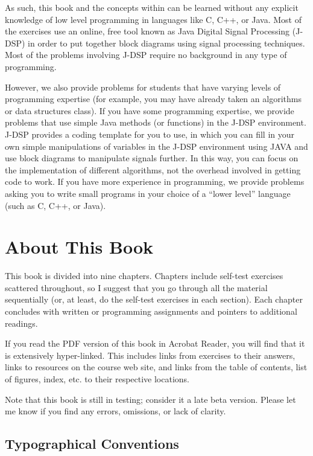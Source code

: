 As such, this book and the concepts within can be learned without any explicit 
knowledge of low level programming in languages like C, C++, or Java. Most of the 
exercises use an online, free tool known as Java Digital Signal Processing (J-DSP)
in order to put together block diagrams using signal processing techniques.
Most of the problems involving J-DSP require no background in any type of programming.  

However, we also provide problems for students that have varying 
levels of programming expertise (for example, you may have already taken an 
algorithms or data structures class). If you have some programming expertise, 
we provide problems that use simple Java methods (or functions) in the J-DSP environment. 
J-DSP provides a coding template for you to use, in which you can fill in
your own simple manipulations of variables in the J-DSP environment
using JAVA and use block diagrams to manipulate signals further. 
In this way, you can focus on the implementation of different algorithms, 
not the overhead involved in getting code to work.
If you have more experience in programming, we provide 
problems asking you to write
small programs in your choice of a ``lower level'' language (such as
C, C++, or Java). 

\section*{About This Book}

This book is divided into nine chapters. Chapters include self-test
exercises scattered throughout, so I suggest that you go through all
the material sequentially (or, at least, do the self-test exercises in
each section).  Each chapter concludes with written or programming
assignments and pointers to additional readings.

If you read the PDF version of this book in Acrobat
Reader, you will find that it is extensively hyper-linked.  This
includes links from exercises to their answers, links to
resources on the course web site, and links from the table of
contents, list of figures, index, etc. to their respective locations.

Note that this book is still in testing; consider it a late beta
version. Please let me know if you find any errors, omissions, or lack
of clarity.

\subsection*{Typographical Conventions}

